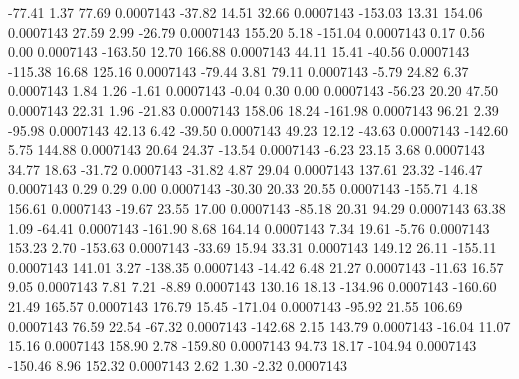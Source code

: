       -77.41        1.37       77.69     0.0007143
      -37.82       14.51       32.66     0.0007143
     -153.03       13.31      154.06     0.0007143
       27.59        2.99      -26.79     0.0007143
      155.20        5.18     -151.04     0.0007143
        0.17        0.56        0.00     0.0007143
     -163.50       12.70      166.88     0.0007143
       44.11       15.41      -40.56     0.0007143
     -115.38       16.68      125.16     0.0007143
      -79.44        3.81       79.11     0.0007143
       -5.79       24.82        6.37     0.0007143
        1.84        1.26       -1.61     0.0007143
       -0.04        0.30        0.00     0.0007143
      -56.23       20.20       47.50     0.0007143
       22.31        1.96      -21.83     0.0007143
      158.06       18.24     -161.98     0.0007143
       96.21        2.39      -95.98     0.0007143
       42.13        6.42      -39.50     0.0007143
       49.23       12.12      -43.63     0.0007143
     -142.60        5.75      144.88     0.0007143
       20.64       24.37      -13.54     0.0007143
       -6.23       23.15        3.68     0.0007143
       34.77       18.63      -31.72     0.0007143
      -31.82        4.87       29.04     0.0007143
      137.61       23.32     -146.47     0.0007143
        0.29        0.29        0.00     0.0007143
      -30.30       20.33       20.55     0.0007143
     -155.71        4.18      156.61     0.0007143
      -19.67       23.55       17.00     0.0007143
      -85.18       20.31       94.29     0.0007143
       63.38        1.09      -64.41     0.0007143
     -161.90        8.68      164.14     0.0007143
        7.34       19.61       -5.76     0.0007143
      153.23        2.70     -153.63     0.0007143
      -33.69       15.94       33.31     0.0007143
      149.12       26.11     -155.11     0.0007143
      141.01        3.27     -138.35     0.0007143
      -14.42        6.48       21.27     0.0007143
      -11.63       16.57        9.05     0.0007143
        7.81        7.21       -8.89     0.0007143
      130.16       18.13     -134.96     0.0007143
     -160.60       21.49      165.57     0.0007143
      176.79       15.45     -171.04     0.0007143
      -95.92       21.55      106.69     0.0007143
       76.59       22.54      -67.32     0.0007143
     -142.68        2.15      143.79     0.0007143
      -16.04       11.07       15.16     0.0007143
      158.90        2.78     -159.80     0.0007143
       94.73       18.17     -104.94     0.0007143
     -150.46        8.96      152.32     0.0007143
        2.62        1.30       -2.32     0.0007143
